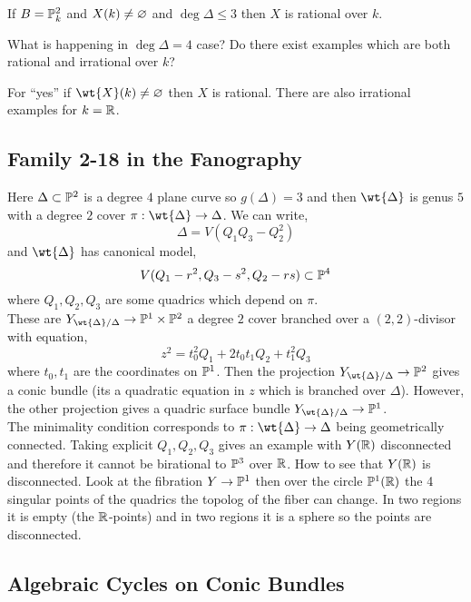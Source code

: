\documentclass[12pt]{article}
\begin{document}
\begin{lemma}[Prakhorov]
If $B = \P^2_k$ and $X(k) \neq \empty$ and $\deg{\Delta} \le 3$ then $X$ is rational over $k$.
\end{lemma}

\begin{question}
What is happening in $\deg{\Delta} = 4$ case? Do there exist examples which are both rational and irrational over $k$?
\end{question}

For ``yes'' if $\wt{X}(k) \neq \empty$ then $X$ is rational. There are also irrational examples for $k = \RR$. 

\subsection{Family 2-18 in the Fanography}

Here $\Delta \subset \P^2$ is a degree $4$ plane curve so $g(\Delta) = 3$ and then $\wt{\Delta}$ is genus $5$ with a degree $2$ cover $\pi : \wt{\Delta} \to \Delta$. We can write,
\[ \Delta = V(Q_1 Q_3 - Q_2^2) \]
and $\wt{\Delta}$ has canonical model,
\[ V(Q_1 - r^2, Q_3 - s^2, Q_2 - rs) \subset \P^4 \]
where $Q_1, Q_2, Q_3$ are some quadrics which depend on $\pi$. 
\bigskip\\
These are $Y_{\wt{\Delta}/\Delta} \to \P^1 \times \P^2$ a degree $2$ cover branched over a $(2, 2)$-divisor with equation,
\[ z^2 = t_0^2 Q_1 + 2 t_0 t_1 Q_2 + t_1^2 Q_3 \]
where $t_0, t_1$ are the coordinates on $\P^1$. Then the projection $Y_{\wt{\Delta} / \Delta} \to \P^2$ gives a conic bundle (its a quadratic equation in $z$ which is branched over $\Delta$). However, the other projection gives a quadric surface bundle $Y_{\wt{\Delta} / \Delta} \to \P^1$. 
\bigskip\\
The minimality condition corresponds to $\pi : \wt{\Delta} \to \Delta$ being geometrically connected. Taking explicit $Q_1, Q_2, Q_3$ gives an example with $Y(\RR)$ disconnected and therefore it cannot be birational to $\P^3$ over $\RR$. How to see that $Y(\RR)$ is disconnected. Look at the fibration $Y \to \P^1$ then over the circle $\P^1(\RR)$ the 4 singular points of the quadrics the topolog of the fiber can change. In two regions it is empty (the $\RR$-points) and in two regions it is a sphere so the points are disconnected. 

\subsection{Algebraic Cycles on Conic Bundles}
\end{document}
